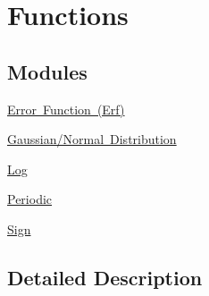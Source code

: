 \hypertarget{group___e_g_x_math-_functions}{}\section{Functions}
\label{group___e_g_x_math-_functions}
\subsection*{Modules}
\begin{DoxyCompactItemize}
\item 
\mbox{\hyperlink{group___e_g_x_math-_functions-_e_r_f}{Error Function (\+Erf)}}
\item 
\mbox{\hyperlink{group___e_g_x_math-_functions-_gaussian}{Gaussian/\+Normal Distribution}}
\item 
\mbox{\hyperlink{group___e_g_x_math-_functions-_log}{Log}}
\item 
\mbox{\hyperlink{group___e_g_x_math-_functions-_periodic}{Periodic}}
\item 
\mbox{\hyperlink{group___e_g_x_math-_functions-_sign}{Sign}}
\end{DoxyCompactItemize}


\subsection{Detailed Description}
